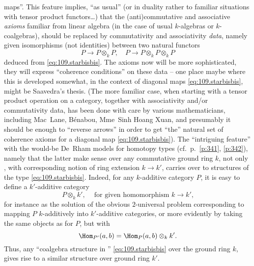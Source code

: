 \begin{remarks}
  maps''. This feature implies, ``as usual'' (or in duality rather to
  familiar situations with tensor product functors\ldots) that the
  (anti)commutative and associative \emph{axioms} familiar from linear
  algebra (in the case of usual $k$-algebras or $k$-coalgebras),
  should be replaced by commutativity and associativity \emph{data},
  namely given isomorphisms (not identities) between two natural
  functors
  \[P\to P\otimes_k P, \quad P\to P\otimes_k P \otimes_k P\]
  deduced from \eqref{eq:109.starbisbis}. The axioms now will be more
  sophisticated, they will express ``coherence conditions'' on these
  data -- one place maybe where this is developed somewhat, in the
  context of diagonal maps \eqref{eq:109.starbisbis}, might be
  Saavedra's thesis.
  (The more familiar case, when starting with a tensor product
  operation on a category, together with associativity and/or
  commutativity data, has been done with care by various
  mathematicians, including Mac~Lane, Bénabou, Mme~Sinh Hoang Xuan,
  and presumably it should be enough to ``reverse arrows'' in order to
  get ``the'' natural set of coherence axioms for a diagonal map
  \eqref{eq:109.starbisbis}). The ``intriguing feature'' with the
  would-be De~Rham models for homotopy types (cf.\ p.\ \ref{p:341},
  \ref{p:342}), namely that the latter make sense over any
  commutative ground ring $k$, not only \bZ, with corresponding notion
  of ring extension $k\to k'$, carries over to structures of the type
  \eqref{eq:109.starbisbis}. Indeed, for any $k$-additive category
  $P$, it is easy to define a $k'$-additive category
  \[P\otimes_kk',\quad \
  \text{for given homomorphism $k\to k'$,}\]
  for instance as the solution of the obvious $2$-universal problem
  corresponding to mapping $P$ $k$-additively into $k'$-additive
  categories, or more evidently by taking the same objects as for $P$,
  but with
  \[\Hom_{P'}(a,b) = \Hom_P(a,b)\otimes_k k'.\]
  Thus, any ``coalgebra structure in \Cat'' \eqref{eq:109.starbisbis}
  over the ground ring $k$, gives rise to a similar structure over
  ground ring $k'$.


\end{remarks}
